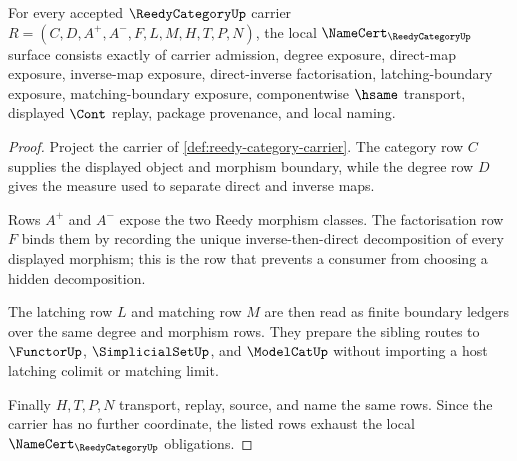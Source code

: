 \begin{theorem}
\label{thm:reedy-category-namecert-obligations}
For every accepted $\ReedyCategoryUp$ carrier $R=(C,D,A^{+},A^{-},F,L,M,H,T,P,N)$, the local $\NameCert_{\ReedyCategoryUp}$ surface consists exactly of carrier admission, degree exposure, direct-map exposure, inverse-map exposure, direct-inverse factorisation, latching-boundary exposure, matching-boundary exposure, componentwise $\hsame$ transport, displayed $\Cont$ replay, package provenance, and local naming.
\end{theorem}
\begin{proof}
Project the carrier of \autoref{def:reedy-category-carrier}. The category row $C$ supplies the displayed object and morphism boundary, while the degree row $D$ gives the measure used to separate direct and inverse maps.

Rows $A^{+}$ and $A^{-}$ expose the two Reedy morphism classes. The factorisation row $F$ binds them by recording the unique inverse-then-direct decomposition of every displayed morphism; this is the row that prevents a consumer from choosing a hidden decomposition.

The latching row $L$ and matching row $M$ are then read as finite boundary ledgers over the same degree and morphism rows. They prepare the sibling routes to $\FunctorUp$, $\SimplicialSetUp$, and $\ModelCatUp$ without importing a host latching colimit or matching limit.

Finally $H,T,P,N$ transport, replay, source, and name the same rows. Since the carrier has no further coordinate, the listed rows exhaust the local $\NameCert_{\ReedyCategoryUp}$ obligations.
\end{proof}


